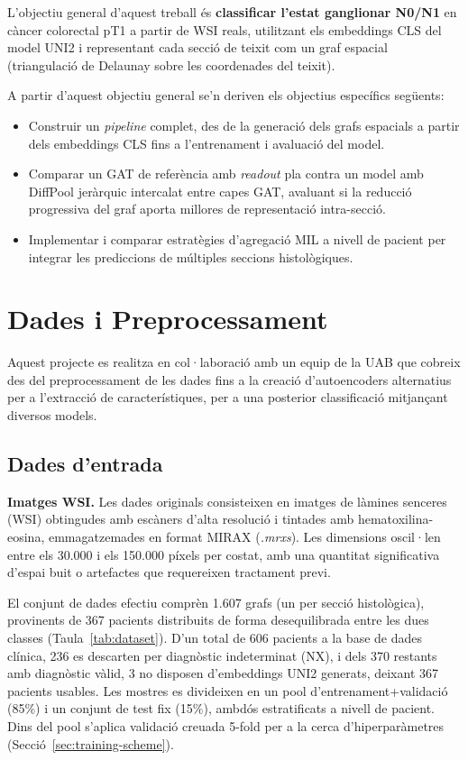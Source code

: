 \documentclass[10pt,a4paper,twocolumn,twoside]{article}
\begin{document}
L'objectiu general d'aquest treball és \textbf{classificar l'estat ganglionar N0/N1} en
càncer colorectal pT1 a partir de WSI reals, utilitzant els embeddings CLS del model UNI2
i representant cada secció de teixit com un graf espacial (triangulació de Delaunay
sobre les coordenades del teixit).

A partir d'aquest objectiu general se'n deriven els objectius específics següents:
\begin{itemize}
    \item Construir un \textit{pipeline} complet, des de la generació dels grafs espacials a
    partir dels embeddings CLS fins a l'entrenament i avaluació del model.
    \item Comparar un GAT de referència amb \textit{readout} pla contra un model amb
    DiffPool jeràrquic intercalat entre capes GAT, avaluant si la reducció
    progressiva del graf aporta millores de representació intra-secció.
    \item Implementar i comparar estratègies d'agregació MIL a nivell de pacient per integrar
    les prediccions de múltiples seccions histològiques.
\end{itemize}

\section{Dades i Preprocessament}

Aquest projecte es realitza en col·laboració amb un equip de la UAB que cobreix des del preprocessament
de les dades fins a la creació d'autoencoders alternatius per a l'extracció de característiques, per a una
posterior classificació mitjançant diversos models.

\subsection{Dades d'entrada}

\textbf{Imatges WSI.} Les dades originals consisteixen en imatges de làmines senceres (WSI) obtingudes amb escàners d'alta resolució i
tintades amb hematoxilina-eosina, emmagatzemades en format MIRAX (\textit{.mrxs}). Les dimensions oscil·len entre
els 30.000 i els 150.000 píxels per costat, amb una quantitat significativa d'espai buit o artefactes que
requereixen tractament previ.

El conjunt de dades efectiu comprèn 1.607 grafs (un per secció histològica), provinents de
367 pacients distribuits de forma desequilibrada entre les dues classes
(Taula~\ref{tab:dataset}). D'un total de 606 pacients a la base de dades clínica, 236 es descarten
per diagnòstic indeterminat (NX), i dels 370 restants amb diagnòstic vàlid, 3 no disposen
d'embeddings UNI2 generats, deixant 367 pacients usables. Les mostres es divideixen en un pool d'entrenament+validació (85\%) i un
conjunt de test fix (15\%), ambdós estratificats a nivell de pacient. Dins del pool s'aplica
validació creuada 5-fold per a la cerca d'hiperparàmetres (Secció~\ref{sec:training-scheme}).
\end{document}
